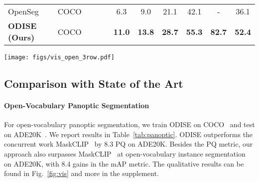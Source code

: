 \documentclass[10pt,twocolumn,letterpaper]{article}
\newcommand{\cmark}{\ding{51}}
\newcommand{\ourmethod}{ODISE}
\begin{document}
\begin{table*}[]
\begin{tabular}{l|l|ccc|cccccc}
OpenSeg\cite{ghiasi2021open}      & COCO       &          & \cmark   & \cmark    & 6.3           & 9.0           & 21.1          & 42.1          & -             & 36.1          \\
\textbf{\ourmethod{} (Ours)}         & COCO       &          & \cmark   & \cmark    & \textbf{11.0} & \textbf{13.8} & \textbf{28.7} & \textbf{55.3} & \textbf{82.7} & \textbf{52.4}
\end{tabular}
\vspace{-1em}
\caption{
    \label{tab:semantic}
    \textbf{Open-vocabulary semantic segmentation performance.}
}
\vspace{-1.2em}
\end{table*}

\begin{figure*}[t]
    \centering
    \vspace{-.5em}
    \texttt{[image: figs/vis\_open\_3row.pdf]}
    \vspace{-1em}
    \caption{
        \textbf{Qualitative Visualization} on COCO (first 2 rows) and ADE20K (last row) validation and test sets. 
        To demonstrate open-vocabulary recognition capability, we merge category names of LVIS, COCO and ADE20K together and perform open-vocabulary inference with ${\sim} 1.5k$ classes directly.
        ``Bamboo'', ``swimming pool'', ``conveyer belt", ``chandelier", ``booth'', ``stool'', ``column'', ``pool table'', ``bannister'', \textit{etc.}, are novel categories from LVIS/ADE20K that are not annotated in COCO. 
        \ourmethod{} shows plausible open-vocabulary panoptic results. The supplement contains more visual results.
    }
    \vspace{-1.2em}
    \label{fig:vis}
\end{figure*}

\subsection{Comparison with State of the Art}
\paragraph{Open-Vocabulary Panoptic Segmentation}
For open-vocabulary panoptic segmentation, we train \ourmethod{} on COCO~\cite{lin2014coco} and test on ADE20K~\cite{zhou2019ade}.
We report results in Table~\ref{tab:panoptic}.
\ourmethod{} outperforms the concurrent work MaskCLIP~\cite{ding2022open} by 8.3 PQ on ADE20K. 
Besides the PQ metric, our approach also surpasses MaskCLIP~\cite{ding2022open} at open-vocabulary instance segmentation on ADE20K, with 8.4 gains in the mAP metric.
The qualitative results can be found in Fig.~\ref{fig:vis} and more in the supplement.
\end{document}
